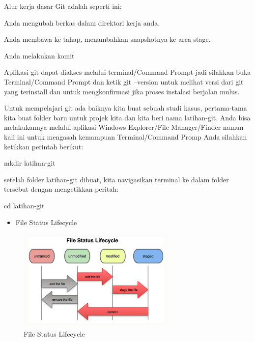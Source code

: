 \vspace{\baselineskip}
\noindent 
 \hspace*{0.5in} Alur kerja dasar Git adalah seperti ini: \par
\noindent 
 \hspace*{0.5in} Anda mengubah berkas dalam direktori kerja anda. \par
\noindent 
 \hspace*{0.5in} Anda membawa ke tahap, menambahkan snapshotnya ke area stage. \par
\noindent 
 \hspace*{0.5in} Anda melakukan komit \par
 \vspace{\baselineskip}
\noindent 
 \hspace*{0.5in} Aplikasi git dapat diakses melalui terminal/Command Prompt jadi silahkan buka Terminal/Command Prompt dan ketik $  $git --version $  $untuk melihat versi dari git yang terinstall dan untuk mengkonfirmasi jika proses instalasi berjalan mulus.  \par
 \vspace{\baselineskip}
 \vspace{\baselineskip}
\noindent 
Untuk mempelajari git ada baiknya kita buat sebuah studi kasus, pertama-tama kita buat folder baru untuk projek kita dan kita beri nama latihan-git. Anda bisa melakukannya melalui aplikasi Windows Explorer/File Manager/Finder namun kali ini untuk mengasah kemampuan Terminal/Command Promp Anda silahkan ketikkan perintah berikut: \par
\vspace{\baselineskip}
\noindent 
 \hspace*{0.5in} mkdir latihan-git \par
\noindent 
setelah folder latihan-git dibuat, kita navigasikan terminal ke dalam folder tersebut dengan mengetikkan peritah: \par
\vspace{\baselineskip}
\noindent 
 \hspace*{0.5in} cd latihan-git \par
 \vspace{\baselineskip}
 
 \begin{itemize}
 	\item File Status Lifecycle
 \end{itemize}
 
 \begin{figure}[ht]
 	\centerline{\includegraphics[width=0.70\textwidth]{figures/Git}}
 	\caption{File Status Lifecycle}
 	\label{File Status Lifecycle}
 \end{figure}
 
